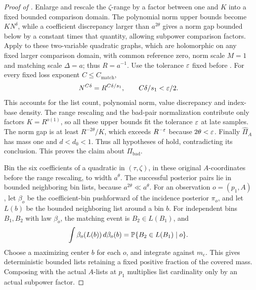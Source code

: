 \begin{proof}[Proof of ]
Enlarge and rescale the \(\zeta\)-range by a factor between one and
\(K\) into a fixed bounded comparison domain.  The polynomial norm
upper bounds become \(KN^\delta\), while a coefficient discrepancy
larger than \(a^{2\theta}\) gives a norm gap bounded below by a
constant times that quantity, allowing subpower comparison factors.
Apply  to these two-variable
quadratic graphs, which are holomorphic on any fixed larger
comparison domain, with common reference zero, norm scale
\(M=1\) and matching scale \(\Delta=a\); thus \(R=a^{-1}\).
Use the tolerance \(\varepsilon\) fixed before .
For every fixed loss exponent \(C\le C_{\mathrm{match}}\),
\[
 N^{C\delta}=R^{C\delta/s_1},\qquad
 C\delta/s_1<\varepsilon/2.
\]
This accounts for the list count, polynomial norm, value discrepancy
and index-base density.  The range rescaling and the bad-pair
normalization contribute only factors \(K=R^{o(1)}\), so all these
upper bounds fit the tolerance \(\varepsilon\) at late samples.
The norm gap is at least \(R^{-2\theta}/K\), which exceeds
\(R^{-\varepsilon}\) because \(2\theta<\varepsilon\).
Finally \(\widehat\Pi_A\) has mass one and \(d<d_0<1\).
Thus all hypotheses of  hold,
contradicting its conclusion.  This proves the claim about
\(\Pi_{\mathrm{bad}}\).

Bin the six coefficients of a quadratic in \((\tau,\zeta)\), in
these original \(A\)-coordinates before the range rescaling, to
width \(a^\theta\).  The successful posterior pairs lie in bounded
neighboring bin lists, because \(a^{2\theta}\ll a^\theta\).
For an observation \(o=(p_1,A)\), let \(\beta_o\) be the
coefficient-bin pushforward of the incidence posterior \(\pi_o\),
and let \(L(b)\) be the bounded neighboring list around a bin \(b\).
For independent bins \(B_1,B_2\) with law \(\beta_o\), the matching
event is \(B_2\in L(B_1)\), and
\[
 \int \beta_o(L(b))\,d\beta_o(b)
   =\mathbb P\{B_2\in L(B_1)\mid o\}.
\]
Choose a maximizing center \(b\) for each \(o\), and integrate
against \(m_{\mathrm c}\).
This gives deterministic bounded lists retaining a fixed positive
fraction of the covered mass.  Composing with the actual
\(A\)-lists at \(p_1\) multiplies list cardinality only by an
actual subpower factor.


\end{proof}
